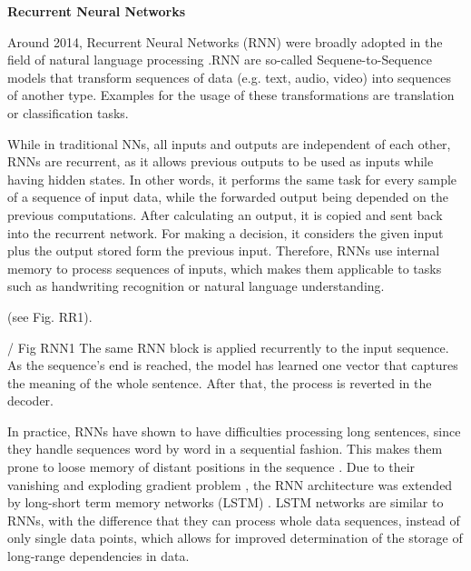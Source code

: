 \textbf{Recurrent Neural Networks}
    \label{sec:RNNs}

Around 2014, Recurrent Neural Networks (RNN) were broadly adopted in the field of natural language processing \cite{jozefowicz2016exploring}.RNN are so-called Sequene-to-Sequence models that transform sequences of data (e.g. text, audio, video) into sequences of another type. Examples for the usage of these transformations are translation or classification tasks.


While in traditional NNs, all inputs and outputs are independent of each other, RNNs are recurrent, as it allows previous outputs to be used as inputs while having hidden states. In other words, it performs the same task for every sample of a sequence of input data, while the forwarded output being depended on the previous computations.
After calculating an output, it is copied and sent back into the recurrent network. For making a decision, it considers the given input plus the output stored form the previous input.
Therefore, RNNs use internal memory to process sequences of inputs, which makes them applicable to tasks such as handwriting recognition or natural language understanding.

(see Fig. RR1).

/ Fig RNN1 The same RNN block is applied recurrently to the input sequence. As the sequence's end is reached, the model has learned one vector that captures the meaning of the whole sentence. After that, the process is reverted in the decoder.


In practice, RNNs have shown to have difficulties processing long sentences, since they handle sequences word by word in a sequential fashion. This makes them prone to loose memory of distant positions in the sequence \cite{mikolov2010recurrent}.
Due to their vanishing and exploding gradient problem \cite{pascanu2013difficulty}, the RNN architecture was extended by long-short term memory networks (LSTM) \cite{hochreiter1997long, graves2005framewise}. 
LSTM networks are similar to RNNs, with the difference that they can process whole data sequences, instead of only single data points, which allows for improved determination of the storage of long-range dependencies in data. 


